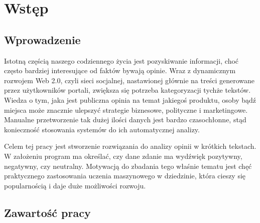 \chapter{Wstęp}
\label{cha:wstep}

\section{Wprowadzenie}
\label{sec:wprowadzenie}
Istotną częścią naszego codziennego życia jest pozyskiwanie informacji, choć często bardziej interesujące od faktów bywają opinie. Wraz z dynamicznym rozwojem Web 2.0, czyli sieci socjalnej, nastawionej głównie na treści generowane przez użytkowników portali, zwiększa się potrzeba kategoryzacji tychże tekstów. Wiedza o tym, jaka jest publiczna opinia na temat jakiegoś produktu, osoby bądź miejsca może znacznie ulepszyć strategie biznesowe, polityczne i marketingowe. Manualne przetworzenie tak dużej ilości danych jest bardzo czasochłonne, stąd konieczność stosowania systemów do ich automatycznej analizy.

Celem tej pracy jest stworzenie rozwiązania do analizy opinii w krótkich tekstach. W założeniu program ma określać, czy dane zdanie ma wydźwięk pozytywny, negatywny, czy neutralny. Motywacją do zbadania tego właśnie tematu jest chęć praktycznego zastosowania uczenia maszynowego w dziedzinie, która cieszy się popularnością i daje duże możliwości rozwoju.  
\section{Zawartość pracy}
\label{sec:zawartosc}

